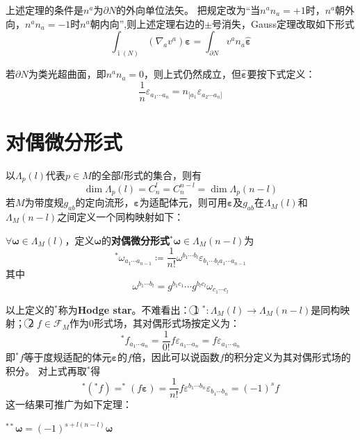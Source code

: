 \begin{note}
    上述定理的条件是$n^a$为$\partial N$的外向单位法矢。
    把规定改为``当$n^an_a = +1$时，$n^a$朝外向，$n^an_a = -1$时$n^a$朝内向'',则上述定理右边的$\pm$号消失，Gauss定理改取如下形式
    $$\int_{\operatorname{i}(N)}(\nabla_av^a)\bm\varepsilon = \int_{\partial N}v^an_a\bm{\hat\varepsilon}$$
    
    若$\partial N$为类光超曲面，即$n^an_a = 0$，则上式仍然成立，但$\bm{\hat\varepsilon}$要按下式定义：
    $$\frac{1}{n}\varepsilon_{a_1 \cdots a_n} = n_{[a_1}\hat\varepsilon_{a_2 \cdots a_n]}$$
\end{note}

\section{对偶微分形式}

以$\Lambda_p(l)$代表$p \in M$的全部$l$形式的集合，则有
$$\dim\Lambda_p(l) = C^l_n = C^{n - l}_n = \dim\Lambda_p(n - l)$$
若$M$为带度规$g_{ab}$的定向流形，$\bm\varepsilon$为适配体元，则可用$\bm\varepsilon$及$g_{ab}$在$\Lambda_M(l)$和$\Lambda_M(n - l)$之间定义一个同构映射如下：

\begin{definition}
    $\forall \bm\omega \in \Lambda_M(l)$，定义$\bm\omega$的\textbf{对偶微分形式}$^*\bm\omega \in \Lambda_M(n - l)$为
    $$^*\omega_{a_1 \cdots a_{n - 1}} \coloneq \frac{1}{n!}\omega^{b_1 \cdots b_l}\varepsilon_{b_1 \cdots b_l a_1 \cdots a_{n - 1}}$$
    其中
    $$\omega^{b_1 \cdots b_l} = g^{b_1c_1} \cdots g^{b_lc_l}\omega_{c_1 \cdots c_l}$$
\end{definition}

\begin{note}
    以上定义的$^*$称为\textbf{Hodge star}。不难看出：
    \textcircled{1} $^* \colon \Lambda_M(l) \to \Lambda_M(n - l)$是同构映射；
    \textcircled{2} $f \in \mathscr{F}_M$作为$0$形式场，其对偶形式场按定义为：
    $$^*f_{a_1 \cdots a_n} = \frac{1}{0!}f\varepsilon_{a_1 \cdots a_n} = f\varepsilon_{a_1 \cdots a_n}$$
    即$^*f$等于度规适配的体元$\bm\varepsilon$的$f$倍，因此可以说函数$f$的积分定义为其对偶形式场的积分。
    对上式再取$^*$得
    $$^*(^*f) = ^*(f\bm\varepsilon) = \frac{1}{n!}f\varepsilon^{b_1 \cdots b_n}\varepsilon_{b_1 \cdots b_n} = (-1)^sf$$
    这一结果可推广为如下定理：
\end{note}

\begin{theorem}
    $^{**}\bm\omega = (-1)^{s + l(n - l)}\bm\omega$
\end{theorem}

